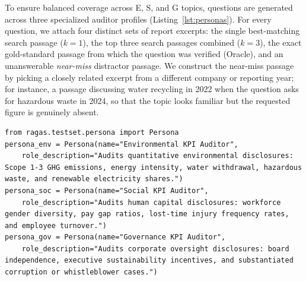 \documentclass[11pt,letterpaper]{article}
\begin{document}
To ensure balanced coverage across E, S, and G topics, questions are generated across three specialized auditor profiles (Listing~\ref{lst:personas}). For every question, we attach four distinct sets of report excerpts: the single best-matching search passage ($k=1$), the top three search passages combined ($k=3$), the exact gold-standard passage from which the question was verified (Oracle), and an unanswerable \textit{near-miss} distractor passage. We construct the near-miss passage by picking a closely related excerpt from a different company or reporting year; for instance, a passage discussing water recycling in 2022 when the question asks for hazardous waste in 2024, so that the topic looks familiar but the requested figure is genuinely absent.

\begin{lstlisting}[caption={ESG Auditor Profiles Used to Balance Environmental, Social, and Governance Questions.}, label={lst:personas}]
from ragas.testset.persona import Persona
persona_env = Persona(name="Environmental KPI Auditor",
    role_description="Audits quantitative environmental disclosures: Scope 1-3 GHG emissions, energy intensity, water withdrawal, hazardous waste, and renewable electricity shares.")
persona_soc = Persona(name="Social KPI Auditor",
    role_description="Audits human capital disclosures: workforce gender diversity, pay gap ratios, lost-time injury frequency rates, and employee turnover.")
persona_gov = Persona(name="Governance KPI Auditor",
    role_description="Audits corporate oversight disclosures: board independence, executive sustainability incentives, and substantiated corruption or whistleblower cases.")
\end{lstlisting}
\end{document}
